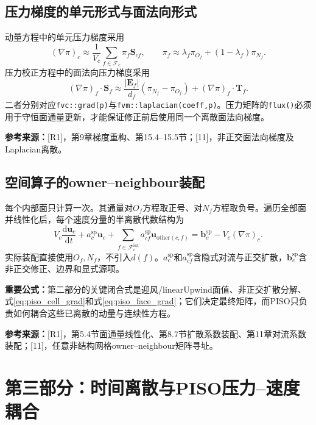 \documentclass[UTF8,12pt,a4paper]{ctexart}
\numberwithin{equation}{section}
\newcommand{\Jasak}{\textnormal{[11]}}
\newcommand{\Rone}{\textnormal{[R1]}}
\newcommand{\source}[1]{\par\smallskip\noindent\colorbox{sourcebg}{%
  \parbox{0.955\linewidth}{\footnotesize\color{sourcegray}\textbf{参考来源：}#1}}\par\smallskip}
\newcommand{\keytitle}[1]{\par\smallskip\noindent\colorbox{keybg}{%
  \parbox{0.965\linewidth}{\color{keyblue}\textbf{重要公式：}#1}}\par\smallskip}
\begin{document}
\subsection{压力梯度的单元形式与面法向形式}
动量方程中的单元压力梯度采用
\begin{equation}
  \boxed{(\nabla\pi)_c\approx\frac{1}{V_c}
  \sum_{f\in\mathcal F_c}\pi_f\bm S_{cf},
  \qquad
  \pi_f\approx\lambda_f\pi_{O_f}+(1-\lambda_f)\pi_{N_f}.}
  \label{eq:piso_cell_grad}
\end{equation}
压力校正方程中的面法向压力梯度采用
\begin{equation}
  \boxed{(\nabla\pi)_f\cdot\bm S_f
  \approx\frac{|\bm E_f|}{d_f}(\pi_{N_f}-\pi_{O_f})
  +(\nabla\pi)_f\cdot\bm T_f.}
  \label{eq:piso_face_grad}
\end{equation}
二者分别对应\texttt{fvc::grad(p)}与\texttt{fvm::laplacian(coeff,p)}。压力矩阵的\texttt{flux()}必须用于守恒面通量更新，才能保证修正前后使用同一个离散面法向梯度。
\source{\Rone，第9章梯度重构、第15.4--15.5节；\Jasak，非正交面法向梯度及Laplacian离散。}

\subsection{空间算子的owner--neighbour装配}
每个内部面只计算一次。其通量对$O_f$方程取正号、对$N_f$方程取负号。遍历全部面并线性化后，每个速度分量的半离散代数结构为
\begin{equation}
  \boxed{V_c\frac{\mathrm d\bm u_c}{\mathrm dt}
  +a_c^{\mathrm{sp}}\bm u_c+
  \sum_{f\in\mathcal F_c^{\mathrm{int}}}a_{cf}^{\mathrm{sp}}
  \bm u_{\mathrm{other}(c,f)}
  =\bm b_c^{\mathrm{sp}}-V_c(\nabla\pi)_c.}
  \label{eq:momentum_algebra}
\end{equation}
实际装配直接使用$O_f,N_f$，不引入$d(f)$。$a_c^{\mathrm{sp}}$和$a_{cf}^{\mathrm{sp}}$含隐式对流与正交扩散，$\bm b_c^{\mathrm{sp}}$含非正交修正、边界和显式源项。
\keytitle{第二部分的关键闭合式是迎风/linearUpwind面值、非正交扩散分解、式\eqref{eq:piso_cell_grad}和式\eqref{eq:piso_face_grad}；它们决定最终矩阵，而PISO只负责如何耦合这些已离散的动量与连续性方程。}
\source{\Rone，第5.4节面通量线性化、第8.7节扩散系数装配、第11章对流系数装配；\Jasak，任意非结构网格owner--neighbour矩阵寻址。}

\section{第三部分：时间离散与PISO压力--速度耦合}
\end{document}
